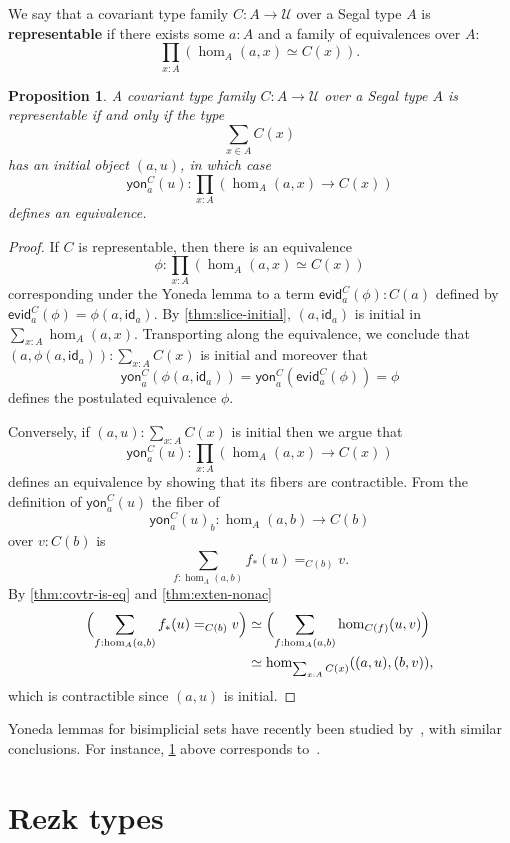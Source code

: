 \documentclass[12pt]{amsart}
\theoremstyle{plain}
\newtheorem{prop}[thm]{Proposition}
\theoremstyle{definition}
\theoremstyle{remark}
\numberwithin{equation}{section}
\newcommand{\univtype}{\mathcal{U}}
\newcommand{\evid}{\mathsf{evid}}
\newcommand{\yon}{\mathsf{yon}}
\newcommand{\idarr}[1]{\mathsf{id}_{#1}}
\newcommand{\Parens}[1]{\Bigl(#1\Bigr)}
\begin{document}
We say that a covariant type family $C : A \to \univtype$ over a Segal type $A$ is \textbf{representable} if there exists some $a :A$ and a family of equivalences over $A$:
\[ \prod_{x :A} (\hom_A(a,x) \simeq C(x)).\]

\begin{prop}\label{thm:representability} A covariant type family $C : A \to \univtype$ over a Segal type $A$ is representable if and only if the type
\[ \sum_{x \in A} C(x)\] has an initial object $(a,u)$, in which case
\[ \yon^C_a(u) : \prod_{x :A} (\hom_A(a,x) \to C(x))\] defines an equivalence.
\end{prop}
\begin{proof}
If $C$ is representable, then there is an equivalence 
\[ \phi : \prod_{x :A} (\hom_A(a,x) \simeq C(x))\] corresponding under the Yoneda lemma to a term
$\evid^C_a(\phi) : C(a)$ defined by $\evid^C_a(\phi) = \phi(a,\idarr a)$. By \cref{thm:slice-initial}, $(a, \idarr a)$ is initial in $\sum_{x:A}\hom_A(a,x)$. Transporting along the equivalence, we conclude that $(a, \phi(a,\idarr a)) : \sum_{x :A} C(x)$ is initial and moreover that \[ \yon^C_a(\phi(a,\idarr a)) = \yon^C_a( \evid^C_a(\phi)) = \phi\] defines the postulated equivalence $\phi$.

Conversely, if $(a,u) : \sum_{x :A} C(x)$ is initial then we argue that 
\[ \yon^C_a(u) : \prod_{x :A} (\hom_A(a,x) \to C(x))\] defines an equivalence by showing that its fibers are contractible. From the definition of $\yon^C_a(u)$ the fiber of 
\[ \yon^C_a(u)_b : \hom_A(a,b) \to C(b)\] over $v : C(b)$ is \[ \sum_{f : \hom_A(a,b)} f_*(u)=_{C(b)} v.\]
By \cref{thm:covtr-is-eq}  and \cref{thm:exten-nonac}
\begin{align*}
  \Parens{\sum_{f : \hom_A(a,b)} f_*(u)=_{C(b)} v}
  &\simeq \Parens{\sum_{f : \hom_A(a,b)} \hom_{C(f)}(u,v)}\\
  &\simeq \hom_{\sum_{x:A}C(x)}((a,u),(b,v)),
\end{align*}
 which is contractible since $(a,u)$ is initial.
\end{proof}

Yoneda lemmas for bisimplicial sets have recently been studied by~\cite{RV4,kv:yoneda-css,rasekh:yoneda-ss}, with similar conclusions.
For instance, \cref{thm:representability} above corresponds to~\cite[Theorem 5.6]{rasekh:yoneda-ss}.



\section{Rezk types}
\label{sec:Rezk-types}
\end{document}

